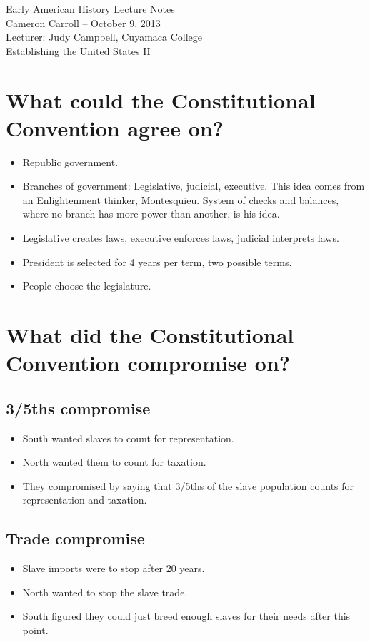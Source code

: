 \documentclass{article}
\begin{document}
  \begin{center}
    {\small{} Early American History Lecture Notes} \\[0.6cm]
    {\small{} Cameron Carroll -- October 9, 2013} \\[0.6cm]
    {\small{} Lecturer: Judy Campbell, Cuyamaca College}\\[1cm]
    {\small{} Establishing the United States II}\\[1cm]
  \end{center}
  
  \tableofcontents
  \newpage

\section{What could the Constitutional Convention agree on?}
\begin{itemize}
  \item Republic government.
  \item Branches of government: Legislative, judicial, executive. This idea comes from an Enlightenment thinker, Montesquieu. System of checks and balances, where no branch has more power than another, is his idea. 
  \item Legislative creates laws, executive enforces laws, judicial interprets laws. 
  \item President is selected for 4 years per term, two possible terms.
  \item People choose the legislature.
\end{itemize}

\section{What did the Constitutional Convention compromise on?}
  \subsection{3/5ths compromise}
    \begin{itemize}
      \item South wanted slaves to count for representation.
      \item North wanted them to count for taxation.
      \item They compromised by saying that 3/5ths of the slave population counts for representation and taxation.
    \end{itemize}
  \subsection{Trade compromise}
    \begin{itemize}
      \item Slave imports were to stop after 20 years.
      \item North wanted to stop the slave trade.
      \item South figured they could just breed enough slaves for their needs after this point.
    \end{itemize}
\end{document}
